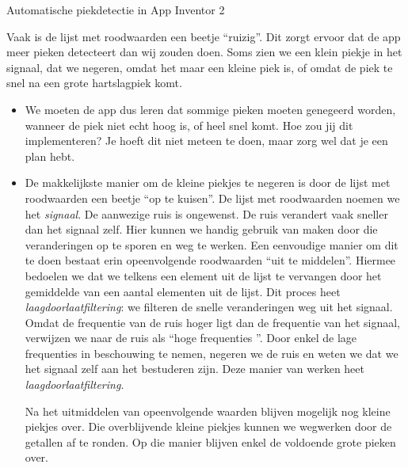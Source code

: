 \begin{opdracht}{Automatische piekdetectie in App Inventor 2}
	\begin{opmerking}
		Vaak is de lijst met roodwaarden een beetje \textquotedblleft ruizig\textquotedblright.
		Dit zorgt ervoor dat de app meer pieken detecteert dan wij zouden doen. Soms zien we een klein piekje in het signaal, dat we negeren, omdat het maar een kleine piek is, of omdat de piek te snel na een grote hartslagpiek komt. 
		
		\begin{itemize}
			\item We moeten de app dus leren dat sommige pieken moeten genegeerd worden, wanneer de piek niet echt hoog is, of heel snel komt. Hoe zou jij dit implementeren? Je hoeft dit niet meteen te doen, maar zorg wel dat je een plan hebt.
			
			\item De makkelijkste manier om de kleine piekjes te negeren is door de lijst met roodwaarden een beetje \textquotedblleft op te kuisen\textquotedblright. De lijst met roodwaarden noemen we het \emph{signaal}. De aanwezige ruis is ongewenst. De ruis verandert vaak sneller dan het signaal zelf. Hier kunnen we handig gebruik van maken door die veranderingen op te sporen en weg te werken. Een eenvoudige manier om dit te doen bestaat erin opeenvolgende roodwaarden \textquotedblleft uit te middelen\textquotedblright. Hiermee bedoelen we dat we telkens een element uit de lijst te vervangen door het gemiddelde van een aantal elementen uit de lijst.
			Dit proces heet \emph{laagdoorlaatfiltering}: we filteren de snelle veranderingen weg uit het signaal. Omdat de frequentie van de ruis hoger ligt dan de frequentie van het signaal, verwijzen we naar de ruis als \textquotedblleft hoge frequenties \textquotedblright. Door enkel de lage frequenties in beschouwing te nemen, negeren we de ruis en weten we dat we het signaal zelf aan het bestuderen zijn.
			Deze manier van werken heet \emph{laagdoorlaatfiltering}.
			
			Na het uitmiddelen van opeenvolgende waarden blijven mogelijk nog kleine piekjes over. Die overblijvende kleine piekjes kunnen we wegwerken door de getallen af te ronden. Op die manier blijven enkel de voldoende grote pieken over.
		\end{itemize}
	\end{opmerking}


\end{opdracht}
